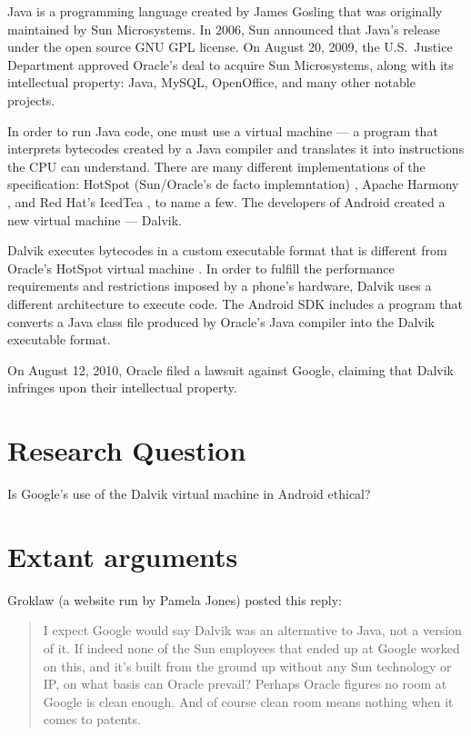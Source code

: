 \documentclass[12pt]{article}
\begin{document}
Java is a programming language created by James Gosling that was originally
maintained by Sun Microsystems.  In 2006, Sun announced that Java's release
under the open source GNU GPL license. \cite{sun-open-sources-java} On August
20, 2009, the U.S.~Justice Department approved Oracle's deal to acquire Sun
Microsystems, along with its intellectual property: Java, MySQL, OpenOffice,
and many other notable projects. \cite{oracle-buys-sun}

In order to run Java code, one must use a virtual machine --- a program that
interprets bytecodes created by a Java compiler and translates it into
instructions the CPU can understand. \cite{javavm-bytecode} There are many
different implementations of the specification: HotSpot (Sun/Oracle's de facto
implemntation) \cite{hotspot}, Apache Harmony \cite{apache-harmony}, and
Red Hat's IcedTea \cite{icedtea}, to name a few.  The developers of Android
created a new virtual machine --- Dalvik.

Dalvik executes bytecodes in a custom executable format \cite{dalvik-bytecode}
that is different from Oracle's HotSpot virtual machine
\cite{javavm-bytecode}.  In order to fulfill the performance requirements and
restrictions imposed by a phone's hardware, Dalvik uses a different
architecture to execute code.  The Android SDK includes a program that converts
a Java class file produced by Oracle's Java compiler into the Dalvik executable
format. \cite{android-sdk-building}

On August 12, 2010, Oracle filed a lawsuit against Google, claiming that Dalvik
infringes upon their intellectual property. \cite{oracle-lawsuit}

\section{Research Question}
Is Google's use of the Dalvik virtual machine in Android ethical?

\section{Extant arguments}

Groklaw (a website run by Pamela Jones) posted this reply: \cite{groklaw}

\begin{quotation}
I expect Google would say Dalvik was an alternative to Java, not a version of
it. If indeed none of the Sun employees that ended up at Google worked on this,
and it's built from the ground up without any Sun technology or IP, on what
basis can Oracle prevail? Perhaps Oracle figures no room at Google is clean
enough. And of course clean room means nothing when it comes to patents.
\end{quotation}
\end{document}
